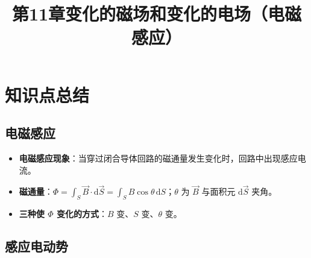 \documentclass[12pt,a4paper]{ctexart}
\title{第11章\quad 变化的磁场和变化的电场（电磁感应）}
\author{}
\date{}
\begin{document}
\maketitle

\section{知识点总结}

\subsection{电磁感应}

\begin{itemize}
    \item \textbf{电磁感应现象}：当穿过闭合导体回路的磁通量发生变化时，回路中出现感应电流。
    \item \textbf{磁通量}：$\Phi=\displaystyle\int_S\vec B\cdot\mathrm d\vec S=\int_S B\cos\theta\,\mathrm dS$；$\theta$ 为 $\vec B$ 与面积元 $\mathrm d\vec S$ 夹角。
    \item \textbf{三种使 $\Phi$ 变化的方式}：$B$ 变、$S$ 变、$\theta$ 变。
\end{itemize}

\subsection{感应电动势}
\end{document}
